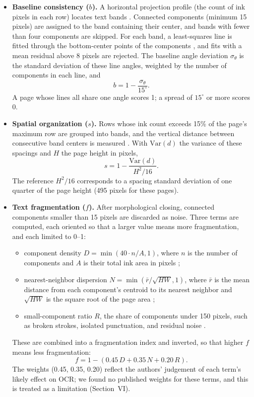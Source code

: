 \begin{itemize}
  \item \textbf{Baseline consistency ($b$).} A horizontal projection profile
  (the count of ink pixels in each row) locates text bands
  \citep{likforman2007textline, papavassiliou2010segmentation}. Connected
  components (minimum 15 pixels) are assigned to the band containing their
  center, and bands with fewer than four components are skipped. For each
  band, a least-squares line is fitted through the bottom-center points of the
  components \citep{ogorman1993docstrum, opencv_shape}, and fits with a mean
  residual above 8 pixels are rejected. The baseline angle deviation
  $\sigma_\theta$ is the standard deviation of these line angles, weighted by
  the number of components in each line, and
  \[ b = 1 - \frac{\sigma_\theta}{15^\circ}. \]
  A page whose lines all share one angle scores 1; a spread of $15^\circ$ or
  more scores 0.

  \item \textbf{Spatial organization ($s$).} Rows whose ink count exceeds 15\%
  of the page's maximum row are grouped into bands, and the vertical distance
  between consecutive band centers is measured
  \citep{likforman2007textline}. With $\mathrm{Var}(d)$ the variance of these
  spacings and $H$ the page height in pixels,
  \[ s = 1 - \frac{\mathrm{Var}(d)}{H^2/16}. \]
  The reference $H^2/16$ corresponds to a spacing standard deviation of one
  quarter of the page height (495 pixels for these pages).

  \item \textbf{Text fragmentation ($f$).} After morphological closing,
  connected components smaller than 15 pixels are discarded as noise. Three
  terms are computed, each oriented so that a larger value means more
  fragmentation, and each limited to 0--1:
  \begin{itemize}
    \item component density $D = \min(40 \cdot n / A, 1)$, where $n$ is the
    number of components and $A$ is their total ink area in pixels
    \citep{fujisawa1992segmentation};
    \item nearest-neighbor dispersion $N = \min(\bar{r} / \sqrt{HW}, 1)$,
    where $\bar{r}$ is the mean distance from each component's centroid to
    its nearest neighbor and $\sqrt{HW}$ is the square root of the page area
    \citep{ogorman1993docstrum, clark1954nearest};
    \item small-component ratio $R$, the share of components under 150 pixels,
    such as broken strokes, isolated punctuation, and residual noise
    \citep{fujisawa1992segmentation, ye2013dqa}.
  \end{itemize}
  These are combined into a fragmentation index and inverted, so that higher
  $f$ means less fragmentation:
  \[ f = 1 - (0.45\,D + 0.35\,N + 0.20\,R). \]
  The weights (0.45, 0.35, 0.20) reflect the authors' judgement of each
  term's likely effect on OCR; we found no published weights for these
  terms, and this is treated as a limitation (Section~VI).
\end{itemize}

